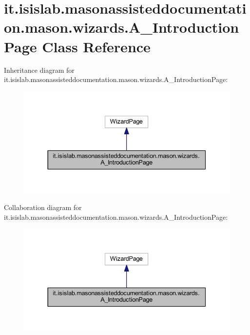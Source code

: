 \hypertarget{classit_1_1isislab_1_1masonassisteddocumentation_1_1mason_1_1wizards_1_1_a___introduction_page}{\section{it.\-isislab.\-masonassisteddocumentation.\-mason.\-wizards.\-A\-\_\-\-Introduction\-Page Class Reference}
\label{classit_1_1isislab_1_1masonassisteddocumentation_1_1mason_1_1wizards_1_1_a___introduction_page}
}


Inheritance diagram for it.\-isislab.\-masonassisteddocumentation.\-mason.\-wizards.\-A\-\_\-\-Introduction\-Page\-:\nopagebreak
\begin{figure}[H]
\begin{center}
\leavevmode
\includegraphics[width=337pt]{classit_1_1isislab_1_1masonassisteddocumentation_1_1mason_1_1wizards_1_1_a___introduction_page__inherit__graph}
\end{center}
\end{figure}


Collaboration diagram for it.\-isislab.\-masonassisteddocumentation.\-mason.\-wizards.\-A\-\_\-\-Introduction\-Page\-:\nopagebreak
\begin{figure}[H]
\begin{center}
\leavevmode
\includegraphics[width=337pt]{classit_1_1isislab_1_1masonassisteddocumentation_1_1mason_1_1wizards_1_1_a___introduction_page__coll__graph}
\end{center}
\end{figure}
